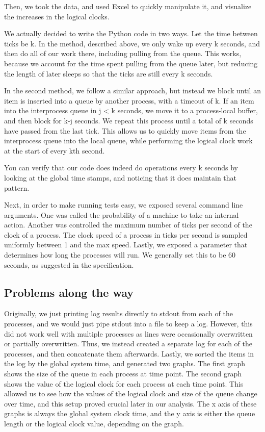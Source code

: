 \documentclass[journal]{IEEEtran}
\begin{document}
Then, we took the data, and used Excel to quickly manipulate it, and visualize the increases in the logical clocks.

We actually decided to write the Python code in two ways. Let the time between ticks be k. In the method, described above, we only wake up every k seconds, and then do all of our work there, including pulling from the queue. This works, because we account for the time spent pulling from the queue later, but reducing the length of later sleeps so that the ticks are still every k seconds.

In the second method, we follow a similar approach, but instead we block until an item is inserted into a queue by another process, with a timeout of k. If an item into the interprocess queue in j < k seconds, we move it to a process-local buffer, and then block for k-j seconds. We repeat this process until a total of k seconds have passed from the last tick. This allows us to quickly move items from the interprocess queue into the local queue, while performing the logical clock work at the start of every kth second.

You can verify that our code does indeed do operations every k seconds by looking at the global time stamps, and noticing that it does maintain that pattern.

Next, in order to make running tests easy, we exposed several command line arguments. One was called the probability of a machine to take an internal action.  Another was controlled the maximum number of ticks per second of the clock of a process. The clock speed of a process in ticks per second is sampled uniformly between 1 and the max speed. Lastly, we exposed a parameter that determines how long the processes will run. We generally set this to be 60 seconds, as suggested in the specification.

\subsection{Problems along the way}
Originally, we just printing log results directly to stdout from each of the processes, and we would just pipe stdout into a file to keep a log. However, this did not work well with multiple processes as lines were occasionally overwritten or partially overwritten. Thus, we instead created a separate log for each of the processes, and then concatenate them afterwards. Lastly, we sorted the items in the log by the global system time, and generated two graphs. The first graph shows the size of the queue in each process at time point. The second graph shows the value of the logical clock for each process at each time point. This allowed us to see how the values of the logical clock and size of the queue change over time, and this setup proved crucial later in our analysis. The x axis of these graphs is always the global system clock time, and the y axis is either the queue length or the logical clock value, depending on the graph.
\end{document}
